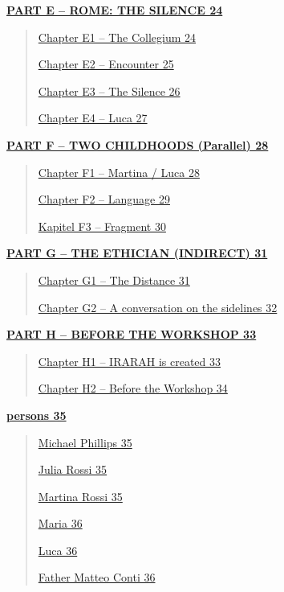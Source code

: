 \documentclass[
]{article}
\begin{document}
\hyperref[part-e-rome-the-silence]{\textbf{PART E -- ROME: THE SILENCE 24}}

\begin{quote}
\hyperref[chapter-e1-the-collegium]{Chapter E1 -- The Collegium 24}

\hyperref[chapter-e2-encounter]{Chapter E2 -- Encounter 25}

\hyperref[chapter-e3-the-silence]{Chapter E3 -- The Silence 26}

\hyperref[chapter-e4-luca]{Chapter E4 -- Luca 27}
\end{quote}

\hyperref[part-f-two-childhoods-parallel]{\textbf{PART F -- TWO CHILDHOODS (Parallel) 28}}

\begin{quote}
\hyperref[chapter-f1-martina-luca]{Chapter F1 -- Martina / Luca 28}

\hyperref[chapter-f2-language]{Chapter F2 -- Language 29}

\hyperref[kapitel-f3-fragment]{Kapitel F3 -- Fragment 30}
\end{quote}

\hyperref[part-g-the-ethician-indirect]{\textbf{PART G -- THE ETHICIAN (INDIRECT) 31}}

\begin{quote}
\hyperref[chapter-g1-the-distance]{Chapter G1 -- The Distance 31}

\hyperref[chapter-g2-a-conversation-on-the-sidelines]{Chapter G2 -- A conversation on the sidelines 32}
\end{quote}

\hyperref[part-h-before-the-workshop]{\textbf{PART H -- BEFORE THE WORKSHOP 33}}

\begin{quote}
\hyperref[chapter-h1-irarah-is-created]{Chapter H1 -- IRARAH is created 33}

\hyperref[chapter-h2-before-the-workshop]{Chapter H2 -- Before the Workshop 34}
\end{quote}

\hyperref[persons]{\textbf{persons 35}}

\begin{quote}
\hyperref[michael-phillips]{Michael Phillips 35}

\hyperref[julia-rossi]{Julia Rossi 35}

\hyperref[martina-rossi]{Martina Rossi 35}

\hyperref[maria]{Maria 36}

\hyperref[luca]{Luca 36}

\hyperref[father-matteo-conti]{Father Matteo Conti 36}
\end{quote}
\end{document}
